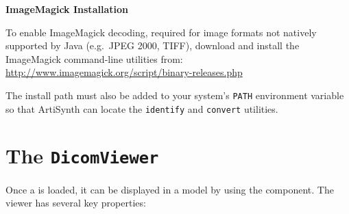 \begin{sideblock}
\textbf{ImageMagick Installation}

To enable ImageMagick decoding, required for image formats not natively supported
by Java (e.g.~JPEG 2000, TIFF), download and install the ImageMagick command-line utilities 
from: \url{http://www.imagemagick.org/script/binary-releases.php}

The install path must also be added to your system's \texttt{PATH} environment variable
so that ArtiSynth can locate the \texttt{identify} and \texttt{convert} utilities.
\end{sideblock}

\section{The \texttt{DicomViewer}}

Once a  is loaded, it can be displayed in a model by using the
 component.  The viewer
has several key properties:

